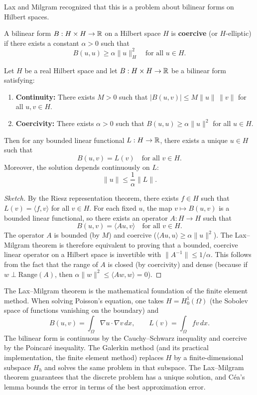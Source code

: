 Lax and Milgram recognized that this is a problem about bilinear forms on Hilbert spaces.

\begin{definition}
A bilinear form \(B: H \times H \to \mathbb{R}\) on a Hilbert space \(H\) is \textbf{coercive} (or \(H\)-elliptic) if there exists a constant \(\alpha > 0\) such that
\[
B(u, u) \geq \alpha \|u\|_H^2 \quad \text{for all } u \in H.
\]
\end{definition}

\begin{theorem}
Let \(H\) be a real Hilbert space and let \(B: H \times H \to \mathbb{R}\) be a bilinear form satisfying:
\begin{enumerate}
    \item \textbf{Continuity:} There exists \(M > 0\) such that \(|B(u,v)| \leq M\|u\|\,\|v\|\) for all \(u, v \in H\).
    \item \textbf{Coercivity:} There exists \(\alpha > 0\) such that \(B(u,u) \geq \alpha \|u\|^2\) for all \(u \in H\).
\end{enumerate}
Then for any bounded linear functional \(L: H \to \mathbb{R}\), there exists a unique \(u \in H\) such that
\[
B(u, v) = L(v) \quad \text{for all } v \in H.
\]
Moreover, the solution depends continuously on \(L\):
\[
\|u\| \leq \frac{1}{\alpha} \|L\|.
\]
\end{theorem}

\begin{proof}[Sketch]
By the Riesz representation theorem, there exists \(f \in H\) such that \(L(v) = \langle f, v \rangle\) for all \(v \in H\). For each fixed \(u\), the map \(v \mapsto B(u,v)\) is a bounded linear functional, so there exists an operator \(A: H \to H\) such that
\[
B(u,v) = \langle A u, v \rangle \quad \text{for all } v \in H.
\]
The operator \(A\) is bounded (by \(M\)) and coercive (\(\langle A u, u \rangle \geq \alpha \|u\|^2\)). The Lax--Milgram theorem is therefore equivalent to proving that a bounded, coercive linear operator on a Hilbert space is invertible with \(\|A^{-1}\| \leq 1/\alpha\). This follows from the fact that the range of \(A\) is closed (by coercivity) and dense (because if \(w \perp \text{Range}(A)\), then \(\alpha\|w\|^2 \leq \langle A w, w \rangle = 0\)).
\end{proof}

The Lax--Milgram theorem is the mathematical foundation of the finite element method. When solving Poisson's equation, one takes \(H = H_0^1(\Omega)\) (the Sobolev space of functions vanishing on the boundary) and
\[
B(u,v) = \int_\Omega \nabla u \cdot \nabla v \,dx,
\qquad
L(v) = \int_\Omega f v \,dx.
\]
The bilinear form is continuous by the Cauchy--Schwarz inequality and coercive by the Poincar\'e inequality. The Galerkin method (and its practical implementation, the finite element method) replaces \(H\) by a finite-dimensional subspace \(H_h\) and solves the same problem in that subspace. The Lax--Milgram theorem guarantees that the discrete problem has a unique solution, and C\'ea's lemma bounds the error in terms of the best approximation error.

